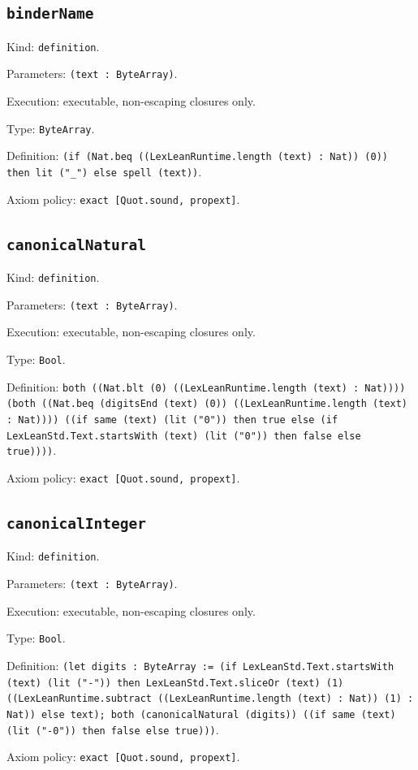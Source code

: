 \documentclass[11pt]{article}
\begin{document}
\subsection*{\texttt{binderName}}
\noindent Kind: \texttt{definition}.\par
\noindent Parameters: \texttt{(text : ByteArray)}.\par
\noindent Execution: executable, non-escaping closures only.\par
\noindent Type: \texttt{ByteArray}.\par
\noindent Definition: \texttt{(if (Nat.beq ((LexLeanRuntime.length (text) : Nat)) (0)) then lit ("\_") else spell (text))}.\par
\noindent Axiom policy: \texttt{exact [Quot.sound, propext]}.\par
\subsection*{\texttt{canonicalNatural}}
\noindent Kind: \texttt{definition}.\par
\noindent Parameters: \texttt{(text : ByteArray)}.\par
\noindent Execution: executable, non-escaping closures only.\par
\noindent Type: \texttt{Bool}.\par
\noindent Definition: \texttt{both ((Nat.blt (0) ((LexLeanRuntime.length (text) : Nat)))) (both ((Nat.beq (digitsEnd (text) (0)) ((LexLeanRuntime.length (text) : Nat)))) ((if same (text) (lit ("0")) then true else (if LexLeanStd.Text.startsWith (text) (lit ("0")) then false else true))))}.\par
\noindent Axiom policy: \texttt{exact [Quot.sound, propext]}.\par
\subsection*{\texttt{canonicalInteger}}
\noindent Kind: \texttt{definition}.\par
\noindent Parameters: \texttt{(text : ByteArray)}.\par
\noindent Execution: executable, non-escaping closures only.\par
\noindent Type: \texttt{Bool}.\par
\noindent Definition: \texttt{(let digits : ByteArray := (if LexLeanStd.Text.startsWith (text) (lit ("-")) then LexLeanStd.Text.sliceOr (text) (1) ((LexLeanRuntime.subtract ((LexLeanRuntime.length (text) : Nat)) (1) : Nat)) else text); both (canonicalNatural (digits)) ((if same (text) (lit ("-0")) then false else true)))}.\par
\noindent Axiom policy: \texttt{exact [Quot.sound, propext]}.\par
\end{document}
